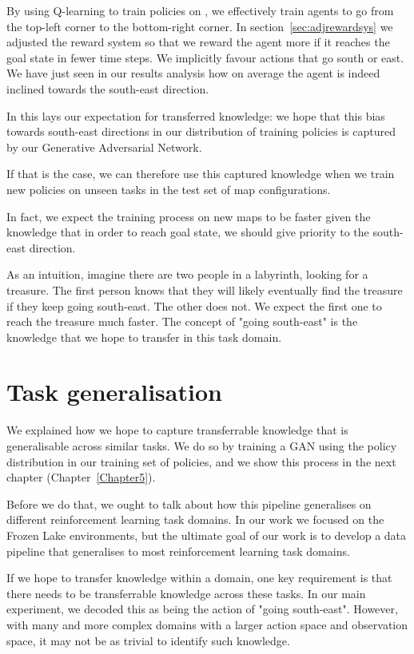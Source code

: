 By using Q-learning to train policies on , we effectively train agents to go from the top-left corner to the bottom-right corner.
In section~\ref{sec:adjrewardsys} we adjusted the reward system so that we reward the agent more if it reaches the goal state in fewer time steps. We implicitly favour actions that go south or east. We have just seen in our results analysis how on average the agent is indeed inclined towards the south-east direction.

In this lays our expectation for transferred knowledge: we hope that this bias towards south-east directions in our distribution of training policies is captured by our Generative Adversarial Network.

If that is the case, we can therefore use this captured knowledge when we train new policies on unseen tasks in the test set of map configurations.

In fact, we expect the training process on new maps to be faster given the knowledge that in order to reach goal state, we should give priority to the south-east direction.

As an intuition, imagine there are two people in a labyrinth, looking for a treasure. The first person knows that they will likely eventually find the treasure if they keep going south-east. The other does not. We expect the first one to reach the treasure much faster. The concept of "going south-east" is the knowledge that we hope to transfer in this task domain.

\section{Task generalisation}
\label{sec:taskgeneralisation}
We explained how we hope to capture transferrable knowledge that is generalisable across similar tasks. We do so by training a GAN using the policy distribution in our training set of policies, and we show this process in the next chapter (Chapter~\ref{Chapter5}).

Before we do that, we ought to talk about how this pipeline generalises on different reinforcement learning task domains. In our work we focused on the Frozen Lake environments, but the ultimate goal of our work is to develop a data pipeline that generalises to most reinforcement learning task domains.

If we hope to transfer knowledge within a domain, one key requirement is that there needs to be transferrable knowledge across these tasks. In our main experiment, we decoded this as being the action of "going south-east". However, with many and more complex domains with a larger action space and observation space, it may not be as trivial to identify such knowledge.

